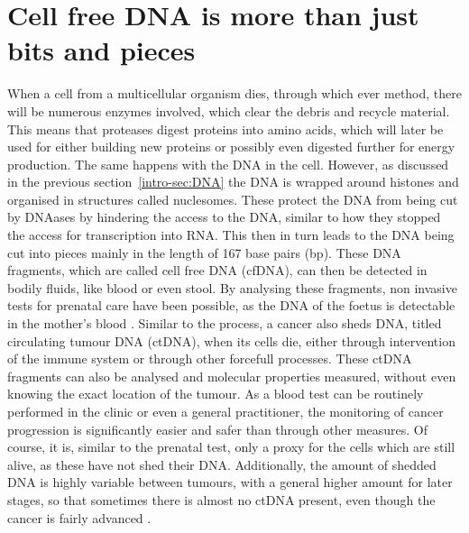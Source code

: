 \section[cfDNA]{Cell free DNA is more than just bits and pieces}
\label{intro-sec:ctDNA}

When a cell from a multicellular organism dies, through which ever method, there will be numerous enzymes involved, which clear the debris and recycle material. This means that proteases digest proteins into amino acids, which will later be used for either building new proteins or possibly even digested further for energy production. The same happens with the DNA in the cell. However, as discussed in the previous section~\ref{intro-sec:DNA} the DNA is wrapped around histones and organised in structures called nuclesomes. These protect the DNA from being cut by DNAases by hindering the access to the DNA, similar to how they stopped the access for transcription into RNA. This then in turn leads to the DNA being cut into pieces mainly in the length of 167 base pairs (bp). 
These DNA fragments, which are called cell free DNA (cfDNA), can then be detected in bodily fluids, like blood or even stool. By analysing these fragments, non invasive tests for prenatal care have been possible, as the DNA of the foetus is detectable in the mother's blood \cite{Dan2012,Nicolaides2013}.
Similar to the process, a cancer also sheds DNA, titled circulating tumour DNA (ctDNA), when its cells die, either through intervention of the immune system or through other forcefull processes. These ctDNA fragments can also be analysed and molecular properties measured, without even knowing the exact location of the tumour. As a blood test can be routinely performed in the clinic or even a general practitioner, the monitoring of cancer progression is significantly easier and safer than through other measures. Of course, it is, similar to the prenatal test, only a proxy for the cells which are still alive, as these have not shed their DNA. Additionally, the amount of shedded DNA is highly variable between tumours, with a general higher amount for later stages, so that sometimes there is almost no ctDNA present, even though the cancer is fairly advanced \cite{Diehl2008,Schwarzenbach2011}.

